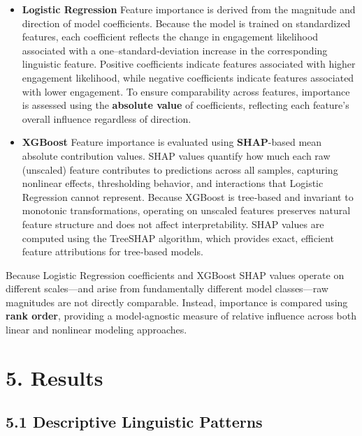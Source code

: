 \documentclass[
]{article}
\begin{document}
\begin{itemize}

\item \textbf{Logistic Regression}  
Feature importance is derived from the magnitude and direction of model coefficients. Because the model is trained on standardized features, each coefficient reflects the change in engagement likelihood associated with a one–standard‑deviation increase in the corresponding linguistic feature. Positive coefficients indicate features associated with higher engagement likelihood, while negative coefficients indicate features associated with lower engagement. To ensure comparability across features, importance is assessed using the \textbf{absolute value} of coefficients, reflecting each feature’s overall influence regardless of direction. 

\item \textbf{XGBoost}  
Feature importance is evaluated using \textbf{SHAP}-based mean absolute contribution values. SHAP values quantify how much each raw (unscaled) feature contributes to predictions across all samples, capturing nonlinear effects, thresholding behavior, and interactions that Logistic Regression cannot represent. Because XGBoost is tree‑based and invariant to monotonic transformations, operating on unscaled features preserves natural feature structure and does not affect interpretability. SHAP values are computed using the TreeSHAP algorithm, which provides exact, efficient feature attributions for tree‑based models.

\end{itemize}

Because Logistic Regression coefficients and XGBoost SHAP values operate
on different scales---and arise from fundamentally different model
classes---raw magnitudes are not directly comparable. Instead,
importance is compared using \textbf{rank order}, providing a
model‑agnostic measure of relative influence across both linear and
nonlinear modeling approaches.

\hypertarget{results}{%
\section{5. Results}\label{results}}

\hypertarget{descriptive-linguistic-patterns}{%
\subsection{5.1 Descriptive Linguistic
Patterns}\label{descriptive-linguistic-patterns}}
\end{document}
